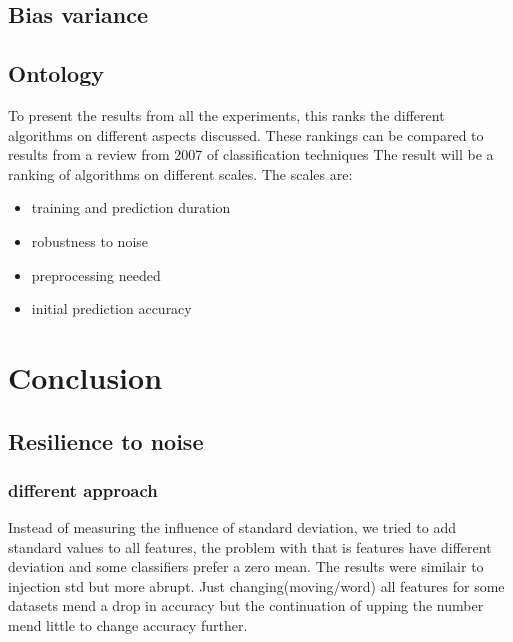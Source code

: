 \documentclass[a4paper,10pt]{article}
\begin{document}
\subsection{Bias variance}


\subsection{Ontology}
To present the results from all the experiments, this ranks the different algorithms on different aspects discussed.
These rankings can be compared to results from a review from 2007 of classification techniques \cite{RevClass}
The result will be a ranking of algorithms on different scales. The scales are:
\begin{itemize}
	\item training and prediction duration
	\item robustness to noise
	\item preprocessing needed
	\item initial prediction accuracy
\end{itemize} 








\newpage
\section{Conclusion} \label{Chapter5}

\subsection{Resilience to noise}



\subsubsection{different approach}
Instead of measuring the influence of standard deviation, we tried to add standard values to all features, the problem with that is features have different deviation and some classifiers prefer a zero mean. The results were similair to injection std but more abrupt. Just changing(moving/word) all features for some datasets mend a drop in accuracy but the continuation of upping the number mend little to change accuracy further.
\end{document}
